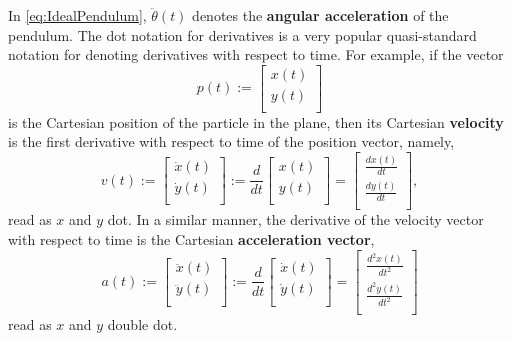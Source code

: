 In \eqref{eq:IdealPendulum}, $\ddot{\theta}(t)$ denotes the \textbf{angular acceleration} of the pendulum. The dot notation for derivatives is a very popular quasi-standard notation for denoting derivatives with respect to time. For example, if the vector
\begin{equation}
\label{eq:CartesianPosition}
  p(t):=\left[
\begin{array}{c}
x(t)\\
y(t)\\
\end{array}
\right]  
\end{equation}
is the Cartesian position of the particle in the plane, then its 
Cartesian \textbf{velocity} is the first derivative with respect to time of the position vector, namely,
\begin{equation}
\label{eq:CartesianVelocity}
v(t):=\left[
\begin{array}{c}
\dot x(t)\\
\dot y(t)\\
\end{array}
\right]:= \frac{d}{dt}  \left[
\begin{array}{c}
x(t)\\
y(t)\\
\end{array}
\right] = \left[ \begin{array}{c}
\frac{ dx(t)}{dt}\\
\frac{d y(t)}{dt}\\
\end{array}
\right], 
\end{equation}
read as $x$ and $y$ dot. In a similar manner, the derivative of the velocity vector with respect to time is the Cartesian \textbf{acceleration vector}, 
\begin{equation}
\label{eq:CartesianAcceleration}
a(t):=\left[
\begin{array}{c}
\ddot x(t)\\
\ddot y(t)\\
\end{array}
\right]:= \frac{d}{dt} \left[
\begin{array}{c}
\dot x(t)\\
\dot y(t)\\
\end{array}
\right] =  \left[ \begin{array}{c}
\frac{ d^2x(t)}{dt^2}\\
\frac{d^2 y(t)}{dt^2}\\
\end{array}
\right] 
\end{equation}
read as $x$ and $y$ double dot.


